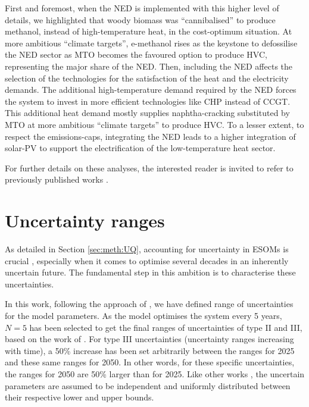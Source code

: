First and foremost, when the \gls{NED} is implemented with this higher level of details, we highlighted that woody biomass was ``cannibalised'' to produce methanol, instead of high-temperature heat, in the cost-optimum situation. At more ambitious ``climate targets'', e-methanol rises as the keystone to defossilise the \gls{NED} sector as \gls{MTO} becomes the favoured option to produce \gls{HVC}, representing the major share of the \gls{NED}. Then, including the \gls{NED} affects the selection of the technologies for the satisfaction of the heat and the electricity demands. The additional high-temperature demand required by the \gls{NED} forces the system to invest in more efficient technologies like \gls{CHP} instead of \gls{CCGT}. This additional heat demand mostly supplies naphtha-cracking substituted by \gls{MTO} at more ambitious ``climate targets'' to produce \gls{HVC}. To a lesser extent, to respect the emissions-caps, integrating the \gls{NED} leads to a higher integration of solar-\gls{PV} to support the electrification of the low-temperature heat sector.


For further details on these analyses, the interested reader is invited to refer to previously published works \cite{rixhon2021comprehensive,rixhon2022integration}.

\section{Uncertainty ranges}
\label{sec:cs:uncertainty}
As detailed in Section \ref{sec:meth:UQ}, accounting for uncertainty in \gls{ESOMs} is crucial \cite{mavromatidis2018uncertainty}, especially when it comes to optimise several decades in an inherently uncertain future. The fundamental step in this ambition is to characterise these uncertainties. 


In this work, following the approach of \citet{Moret2017PhDThesis}, we have defined range of uncertainties for the model parameters. As the model optimises the system every 5 years, $N=5$ has been selected to get the final ranges of uncertainties of type II and III, based on the work of \citet{Moret2017PhDThesis}. For type III uncertainties (\ie uncertainty ranges increasing with time), a 50\% increase has been set arbitrarily between the ranges for 2025 and these same ranges for 2050. In other words, for these specific uncertainties, the ranges for 2050 are 50\% larger than for 2025. Like other works \cite{li2019renewables,coppitters2021robust}, the uncertain parameters are assumed to be independent and uniformly distributed between their respective lower and upper bounds. 

